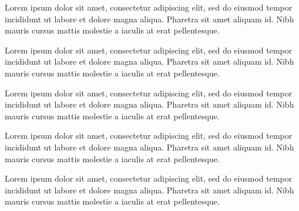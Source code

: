 
\begin{agradecimentos}[AGRADECIMENTOS]
Lorem ipsum dolor sit amet, consectetur adipiscing elit, sed do eiusmod tempor incididunt ut labore et dolore magna aliqua. Pharetra sit amet aliquam id. Nibh mauris cursus mattis molestie a iaculis at erat pellentesque. 


Lorem ipsum dolor sit amet, consectetur adipiscing elit, sed do eiusmod tempor incididunt ut labore et dolore magna aliqua. Pharetra sit amet aliquam id. Nibh mauris cursus mattis molestie a iaculis at erat pellentesque. 


Lorem ipsum dolor sit amet, consectetur adipiscing elit, sed do eiusmod tempor incididunt ut labore et dolore magna aliqua. Pharetra sit amet aliquam id. Nibh mauris cursus mattis molestie a iaculis at erat pellentesque. 


Lorem ipsum dolor sit amet, consectetur adipiscing elit, sed do eiusmod tempor incididunt ut labore et dolore magna aliqua. Pharetra sit amet aliquam id. Nibh mauris cursus mattis molestie a iaculis at erat pellentesque. 


Lorem ipsum dolor sit amet, consectetur adipiscing elit, sed do eiusmod tempor incididunt ut labore et dolore magna aliqua. Pharetra sit amet aliquam id. Nibh mauris cursus mattis molestie a iaculis at erat pellentesque. 
\end{agradecimentos}
